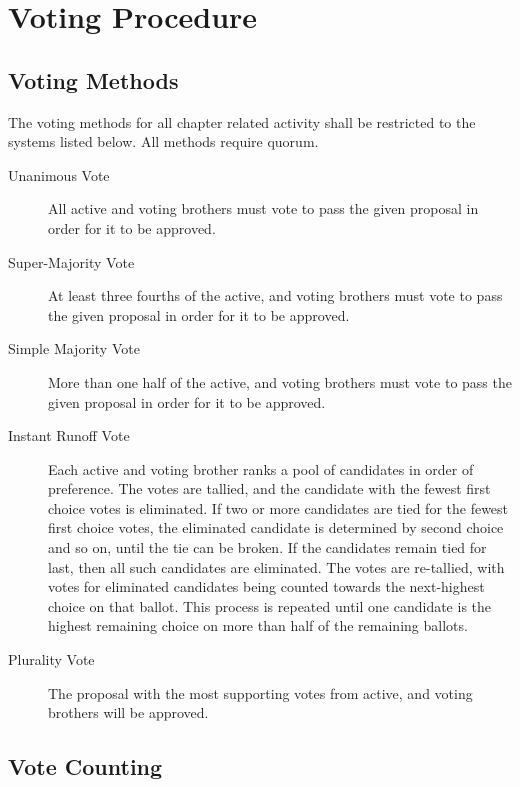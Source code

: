 \chapter{Voting Procedure}
\label{cha:voting-procedure}

\section{Voting Methods}
\label{sec:voting-methods}

The voting methods for all chapter related activity shall be restricted to the
systems listed below.
All methods require quorum.

\begin{description}
    \item[Unanimous Vote] All active and voting brothers must vote to pass the
        given proposal in order for it to be approved.
    \item[Super-Majority Vote] At least three fourths of the active, and voting
        brothers must vote to pass the given proposal in order for it to be
        approved.
    \item[Simple Majority Vote] More than one half of the active, and voting
        brothers must vote to pass the given proposal in order for it to be
        approved.
    \item[Instant Runoff Vote] Each active and voting brother ranks a pool of
        candidates in order of preference.
        The votes are tallied, and the candidate with the fewest first choice
        votes is eliminated.
        If two or more candidates are tied for the fewest first choice votes,
        the eliminated candidate is determined by second choice and so on,
        until the tie can be broken.
        If the candidates remain tied for last, then all such candidates are
        eliminated.
        The votes are re-tallied, with votes for eliminated candidates being
        counted towards the next-highest choice on that ballot.
        This process is repeated until one candidate is the highest remaining
        choice on more than half of the remaining ballots.
    \item[Plurality Vote] The proposal with the most supporting votes from
        active, and voting brothers will be approved.
\end{description}

\section{Vote Counting}
\label{sec:vote-counting}

